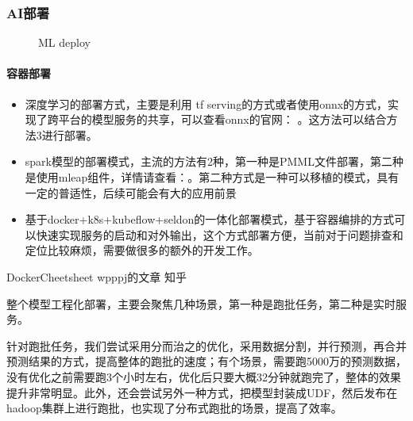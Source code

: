 \documentclass[letterpaper,10pt,english]{sphinxmanual}
\begin{document}
\subsubsection{AI部署}
\label{\detokenize{chapter_AI_dive/AI_deploy:ai}}\label{\detokenize{chapter_AI_dive/AI_deploy::doc}}
\begin{figure}[H]
\centering
\capstart

\noindent{}
\caption{ML deploy\sphinxfootnotemark[982]}\label{\detokenize{chapter_AI_dive/AI_deploy:id3}}\end{figure}
%
\begin{footnotetext}[982]\sphinxAtStartFootnote
{}
%
\end{footnotetext}\ignorespaces 

\paragraph{容器部署}
\label{\detokenize{chapter_AI_dive/AI_deploy:id1}}\begin{itemize}
\item {} 
深度学习的部署方式，主要是利用 tf
serving的方式或者使用onnx的方式，实现了跨平台的模型服务的共享，可以查看onnx的官网：
。这方法可以结合方法3进行部署。

\item {} 
spark模型的部署模式，主流的方法有2种，第一种是PMML文件部署，第二种是使用mleap组件，详情请查看：。第二种方式是一种可以移植的模式，具有一定的普适性，后续可能会有大的应用前景

\item {} 
基于docker+k8s+kubeflow+seldon的一体化部署模式，基于容器编排的方式可以快速实现服务的启动和对外输出，这个方式部署方便，当前对于问题排查和定位比较麻烦，需要做很多的额外的开发工作。

\end{itemize}

Docker\sphinxhyphen{}Cheet\sphinxhyphen{}sheet \sphinxhyphen{} wpppj的文章 \sphinxhyphen{} 知乎

整个模型工程化部署，主要会聚焦几种场景，第一种是跑批任务，第二种是实时服务。

针对跑批任务，我们尝试采用分而治之的优化，采用数据分割，并行预测，再合并预测结果的方式，提高整体的跑批的速度；有个场景，需要跑5000万的预测数据，没有优化之前需要跑3个小时左右，优化后只要大概32分钟就跑完了，整体的效果提升非常明显。此外，还会尝试另外一种方式，把模型封装成UDF，然后发布在hadoop集群上进行跑批，也实现了分布式跑批的场景，提高了效率。
\end{document}

